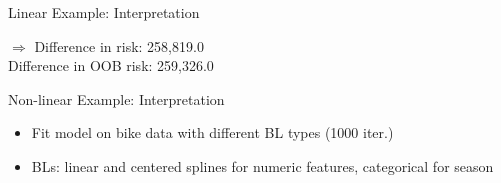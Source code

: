 \documentclass[11pt,compress,t,notes=noshow, aspectratio=169, xcolor=table]{beamer}
\begin{document}
\begin{frame}{Linear Example: Interpretation}
\begin{center}
\scriptsize
$\Rightarrow$ Difference in risk: 258,819.0\\
Difference in OOB risk: 259,326.0\\

\end{center}

\end{frame}


\begin{frame}{Non-linear Example: Interpretation}

\begin{itemize}
    \item Fit model on bike data with different BL types (1000 iter.) 
    \item BLs: linear and centered splines for numeric features, categorical for season
\end{itemize}
\begin{columns}[T, totalwidth = \linewidth]
\end{columns}
\end{frame}
\end{document}
